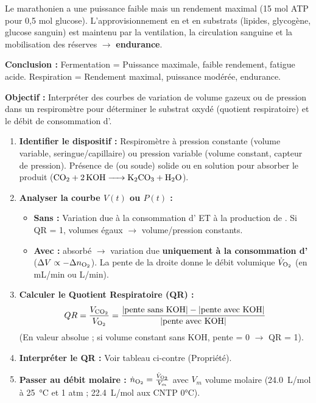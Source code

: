 \documentclass[11pt]{article}
\begin{document}
\begin{exoresolu}
\begin{enumerate}
              Le marathonien a une puissance faible mais un rendement maximal (15 mol ATP pour 0,5 mol glucose). L'approvisionnement en  et en substrats (lipides, glycogène, glucose sanguin) est maintenu par la ventilation, la circulation sanguine et la mobilisation des réserves $\to$ \textbf{endurance}.
    \end{enumerate}
    \textbf{Conclusion :} Fermentation = Puissance maximale, faible rendement, fatigue acide. Respiration = Rendement maximal, puissance modérée, endurance.
\end{exoresolu}

\begin{methode}
    \textbf{Objectif :} Interpréter des courbes de variation de volume gazeux ou de pression dans un respiromètre pour déterminer le substrat oxydé (quotient respiratoire) et le débit de consommation d'.
    \begin{enumerate}
        \item \textbf{Identifier le dispositif :} Respiromètre à pression constante (volume variable, seringue/capillaire) ou pression variable (volume constant, capteur de pression). Présence de  (ou soude) solide ou en solution pour absorber le  produit ($\ce{CO2 + 2 KOH -> K2CO3 + H2O}$).
        \item \textbf{Analyser la courbe $V(t)$ ou $P(t)$ :}
              \begin{itemize}
                  \item \textbf{Sans  :} Variation due à la consommation d' ET à la production de . Si QR = 1, volumes égaux $\to$ volume/pression constants.
                  \item \textbf{Avec  :}  absorbé $\to$ variation due \textbf{uniquement à la consommation d'} ($\Delta V \propto -\Delta n_{\ce{O2}}$). La pente de la droite donne le débit volumique $\dot{V}_{\ce{O2}}$ (en mL/min ou L/min).
              \end{itemize}
        \item \textbf{Calculer le Quotient Respiratoire (QR) :}
              \[ QR = \frac{V_{\ce{CO2}}}{V_{\ce{O2}}} = \frac{|\text{pente sans KOH}| - |\text{pente avec KOH}|}{|\text{pente avec KOH}|} \]
              (En valeur absolue ; si volume constant sans KOH, pente = 0 $\to$ QR = 1).
        \item \textbf{Interpréter le QR :} Voir tableau ci-contre (Propriété).
        \item \textbf{Passer au débit molaire :} $\dot{n}_{\ce{O2}} = \frac{\dot{V}_{\ce{O2}}}{V_m}$ avec $V_m$ volume molaire (\SI{24,0}{L/mol} à \SI{25}{\celsius} et 1 atm ; \SI{22,4}{L/mol} aux CNTP 0°C).
    \end{enumerate}
\end{methode}
\end{document}
